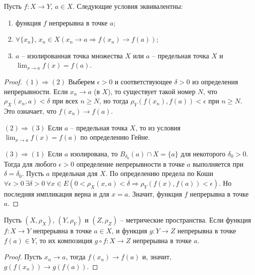 \begin{lemma}
    Пусть $f: X \to Y$, $a \in X$. Следующие условия эквивалентны:
    \begin{enumerate}
        \item функция $f$ непрерывна в точке $a$;
        \item $\forall \{x_{n}\}$, $x_{n} \in X \left(x_{n} \to a \Rightarrow f(x_{n}) \to f(a)\right)$;
        \item $a$ -- изолированная точка множества $X$ или $a$ -- предельная точка $X$ и $\lim_{x \to a} f(x) = f(a)$.
    \end{enumerate}
\end{lemma}

\begin{proof}
    $(1) \Rightarrow (2)$ Выберем $\epsilon > 0$ и соответствующее $\delta > 0$ из определения непрерывности. Если $x_{n} \to a$ (в $X$), то существует такой номер $N$, что $\rho_{X}(x_{n}, a) < \delta$ при всех $n \geq N$, но тогда $\rho_{Y}(f(x_{n}), f(a)) < \epsilon$ при $n \geq N$. Это означает, что $f(x_{n}) \to f(a)$.

    $(2) \Rightarrow (3)$ Если $a$ -- предельная точка $X$, то из условия $\lim_{x \to a} f(x) = f(a)$ по определению Гейне.

    $(3) \Rightarrow (1)$ Если $a$ изолирована, то $B_{\delta_{0}}(a) \cap X = \{a\}$ для некоторого $\delta_{0} > 0$. Тогда для любого $\epsilon > 0$ определение непрерывности в точке $a$ выполняется при $\delta = \delta_{0}$. Пусть $a$ предельная для $X$. По определению предела по Коши $\forall \epsilon > 0 \ \exists \delta > 0 \ \forall x \in E \left(0 < \rho_{X}(x, a) < \delta \Rightarrow \rho_{Y}(f(x), f(a)) < \epsilon\right)$. Но последняя импликация верна и для $x = a$. Значит, функция $f$ непрерывна в точке $a$.
\end{proof}

\begin{theorem}
    Пусть $(X, \rho_{X})$, $(Y, \rho_{Y})$ и $(Z, \rho_{Z})$ -- метрические пространства. Если функция $f: X \to Y$ непрерывна в точке $a \in X$, и функция $g: Y \to Z$ непрерывна в точке $f(a) \in Y$, то их композиция $g \circ f: X \to Z$ непрерывна в точке $a$.
\end{theorem}

\begin{proof}
    Пусть $x_{n} \to a$, тогда $f(x_{n}) \to f(a)$ и, значит, $g(f(x_{n})) \to g(f(a))$.
\end{proof}

